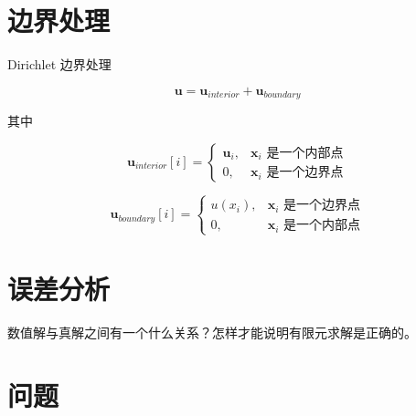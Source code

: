 \documentclass{article}
\begin{document}
\section{边界处理}

Dirichlet 边界处理

$$
\mathbf u = \mathbf u_{interior} + \mathbf u_{boundary}
$$

其中

$$
\mathbf u_{interior}[i] = 
\begin{cases}
\mathbf u_i, & \mathbf x_i \text{ 是一个内部点}\\
0, & \mathbf x_i \text{ 是一个边界点}
\end{cases}
$$

$$
\mathbf u_{boundary}[i] = 
\begin{cases}
u(x_i), & \mathbf x_i \text{ 是一个边界点}\\
0, & \mathbf x_i \text{ 是一个内部点}
\end{cases}
$$

\section{误差分析}
数值解与真解之间有一个什么关系？怎样才能说明有限元求解是正确的。


\section{问题}

\cite{fem_2010}


\end{document}
